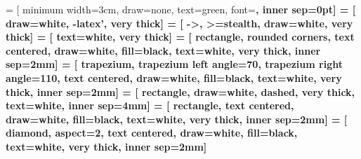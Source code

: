  = [
    minimum width=3cm,
    draw=none,
    text=green,
    font=\bf,
    inner sep=0pt]
 = [
    draw=white,
    -latex',
    very thick]
 = [
    ->,
    >=stealth,
    draw=white,
    very thick]
 = [
    text=white,
    very thick]
 = [
    rectangle,
    rounded corners,
    text centered,
    draw=white,
    fill=black,
    text=white,
    very thick,
    inner sep=2mm]
 = [
    trapezium,
    trapezium left angle=70,
    trapezium right angle=110,
    text centered,
    draw=white,
    fill=black,
    text=white,
    very thick,
    inner sep=2mm]
 = [
    rectangle,
    draw=white,
    dashed,
    very thick,
    text=white,
    inner sep=4mm]
 = [
    rectangle,
    text centered,
    draw=white,
    fill=black,
    text=white,
    very thick,
    inner sep=2mm]
 = [
    diamond,
    aspect=2,
    text centered,
    draw=white,
    fill=black,
    text=white,
    very thick,
    inner sep=2mm]
